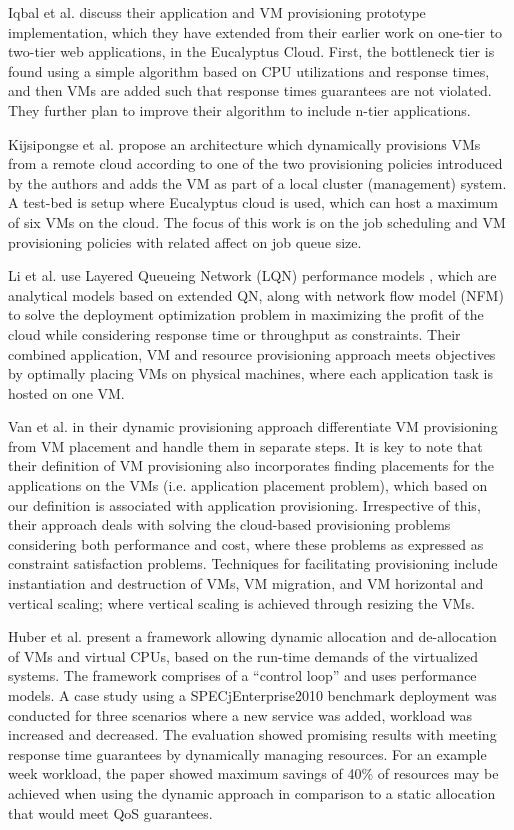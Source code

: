 \documentclass[10pt,journal,cspaper,compsoc]{IEEEtran}
\begin{document}
Iqbal et al. \cite{iqbal2010sla6} discuss their application and VM provisioning prototype implementation, which they have extended from their earlier work \cite{2009_Iqbal_OneTier} on one-tier to two-tier web applications, in the Eucalyptus Cloud. First, the bottleneck tier is found using a simple algorithm based on CPU utilizations and response times, and then VMs are added such that response times guarantees are not violated. They further plan to improve their algorithm to include n-tier applications. 

Kijsipongse et al. \cite{kijsipongse2010autonomic25} propose an architecture which dynamically provisions VMs from a remote cloud according to one of the two provisioning policies introduced by the authors and adds the VM as part of a local cluster (management) system. A test-bed is setup where Eucalyptus cloud is used, which can host a maximum of six VMs on the cloud. The focus of this work is on the job scheduling and VM provisioning policies with related affect on job queue size.

Li et al. \cite{jimliwoodside2009performance5} use Layered Queueing Network (LQN) performance models \cite{2009_Franks_EnhancedModelingLQN}, which are analytical models based on extended QN, along with network flow model (NFM) to solve the deployment optimization problem in maximizing the profit of the cloud while considering response time or throughput as constraints. Their combined application, VM and resource provisioning approach meets objectives by optimally placing VMs on physical machines, where each application task is hosted on one VM.

Van et al. \cite{2009_AutoVMManagement_NguyenVan} in their dynamic provisioning approach differentiate VM provisioning from VM placement and handle them in separate steps. It is key to note that their definition of VM provisioning also incorporates finding placements for the applications on the VMs (i.e. application placement problem), which based on our definition is associated with application provisioning. Irrespective of this, their approach deals with solving the cloud-based provisioning problems considering both performance and cost, where these problems as expressed as constraint satisfaction problems. Techniques for facilitating provisioning include instantiation and destruction of VMs, VM migration, and VM horizontal and vertical scaling; where vertical scaling is achieved through resizing the VMs.

Huber et al. \cite{huber2011model4} present a framework allowing dynamic allocation and de-allocation of VMs and virtual CPUs, based on the run-time demands of the virtualized systems. The framework comprises of a ``control loop'' \cite{huber2011model4} and uses performance models. A case study using a SPECjEnterprise2010 benchmark deployment was conducted for three scenarios where a new service was added, workload was increased and decreased. The evaluation showed promising results with meeting response time guarantees by dynamically managing resources. For an example week workload, the paper showed maximum savings of 40\% of resources may be achieved when using the dynamic approach in comparison to a static allocation that would meet QoS guarantees.
\end{document}
